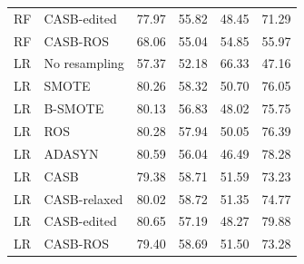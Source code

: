 \begin{table}[pos=!htbp]
\begin{tabular}{llrrrr}
RF & CASB-edited & 77.97 & 55.82 & 48.45 & 71.29 \\
RF & CASB-ROS & 68.06 & 55.04 & 54.85 & 55.97 \\
LR & No resampling & 57.37 & 52.18 & 66.33 & 47.16 \\
LR & SMOTE & 80.26 & 58.32 & 50.70 & 76.05 \\
LR & B-SMOTE & 80.13 & 56.83 & 48.02 & 75.75 \\
LR & ROS & 80.28 & 57.94 & 50.05 & 76.39 \\
LR & ADASYN & 80.59 & 56.04 & 46.49 & 78.28 \\
LR & CASB & 79.38 & 58.71 & 51.59 & 73.23 \\
LR & CASB-relaxed & 80.02 & 58.72 & 51.35 & 74.77 \\
LR & CASB-edited & 80.65 & 57.19 & 48.27 & 79.88 \\
LR & CASB-ROS & 79.40 & 58.69 & 51.50 & 73.28 \\
\bottomrule\end{tabular}
\end{table}
